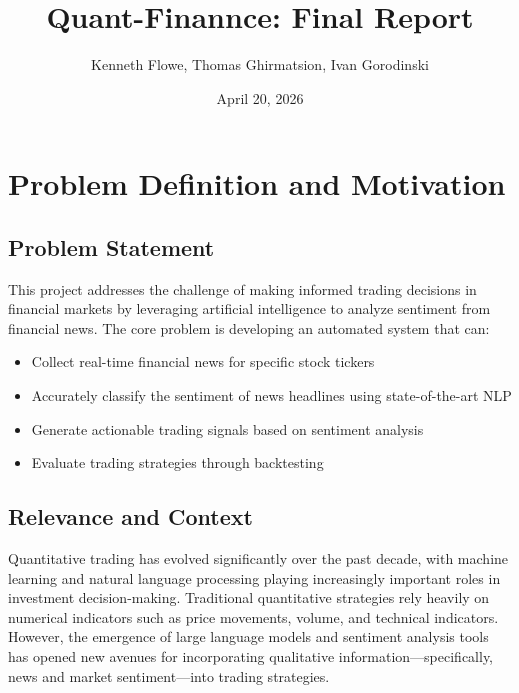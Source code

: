 \documentclass[12pt]{article}
\title{Quant-Finannce: Final Report}
\author{Kenneth Flowe, Thomas Ghirmatsion, Ivan Gorodinski}
\date{April 20, 2026}
\begin{document}
\maketitle
\thispagestyle{empty}




\section{Problem Definition and Motivation}

\subsection{Problem Statement}

This project addresses the challenge of making informed trading decisions in financial markets by leveraging artificial intelligence to analyze sentiment from financial news. The core problem is developing an automated system that can:

\begin{itemize}
\item Collect real-time financial news for specific stock tickers
\item Accurately classify the sentiment of news headlines using state-of-the-art NLP
\item Generate actionable trading signals based on sentiment analysis
\item Evaluate trading strategies through backtesting
\end{itemize}

\subsection{Relevance and Context}

Quantitative trading has evolved significantly over the past decade, with machine learning and natural language processing playing increasingly important roles in investment decision-making. Traditional quantitative strategies rely heavily on numerical indicators such as price movements, volume, and technical indicators. However, the emergence of large language models and sentiment analysis tools has opened new avenues for incorporating qualitative information—specifically, news and market sentiment—into trading strategies.
\end{document}
